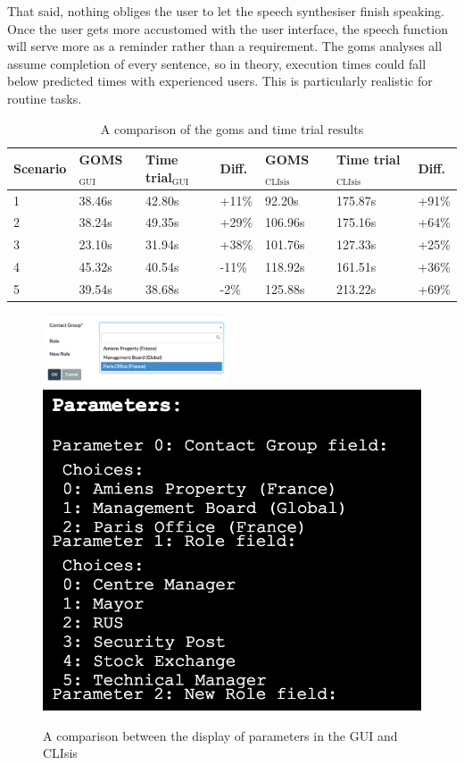 That said, nothing obliges the user to let the speech synthesiser finish speaking. Once the user gets more accustomed with the user interface, the speech function will serve more as a reminder rather than a requirement. The \acrshort{goms} analyses all assume completion of every sentence, so in theory, execution times could fall below predicted times with experienced users. This is particularly realistic for routine tasks.

\begin{table}[h]
	\center
	
	\begin{tabular}{lllllll}
		\toprule
		Scenario		&	GOMS$_{\text{GUI}}$	& Time trial$_{\text{GUI}}$	& Diff. & GOMS$_{\text{CLIsis}}$	& Time trial$_{\text{CLIsis}}$	& Diff. \\		
		\midrule
		1	&	38.46s						& 42.80s							& +11\%					& 92.20s						& 175.87s							& +91\% \\
		2	& 38.24s						& 49.35s							& +29\%					& 106.96s					& 175.16s							& +64\% \\
		3	& 23.10s						& 31.94s							& +38\%					& 101.76s					& 127.33s							&	+25\%\\
		4	& 45.32s						& 40.54s							& -11\%					& 118.92s					& 161.51s							&	+36\%\\
		5	& 39.54s						& 38.68s							& -2\%						& 125.88s					& 213.22s							& +69\%\\
		\bottomrule
	\end{tabular}
	\caption{A comparison of the \acrshort{goms} and time trial results}
	\label{table:gomstimetrialcomparison}
\end{table}

\begin{figure}[h]
	\center
	\includegraphics[width=0.49\textwidth]{figures/paramsgui}
	\includegraphics[scale=.5]{figures/paramsclisis}
	\caption{A comparison between the display of parameters in the GUI and CLIsis}
	\label{figure:parametercomparison}
\end{figure}
